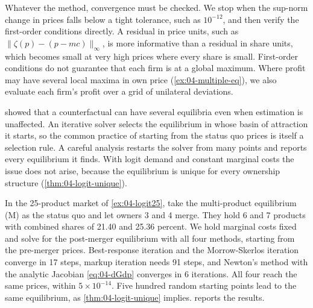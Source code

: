 Whatever the method, convergence must be checked. We stop when the sup-norm change in prices falls below a tight
tolerance, such as $10^{-12}$, and then verify the first-order conditions directly. A residual in price units,
such as $\|\zeta(p) - (p - mc)\|_\infty$, is more informative than a residual in share units, which becomes small
at very high prices where every share is small. First-order conditions do not guarantee that each firm is at a
global maximum. Where profit may have several local maxima in own price (\cref{ex:04-multiple-eq}), we also
evaluate each firm's profit over a grid of unilateral deviations.

 showed that a counterfactual can have several equilibria even when estimation is
unaffected. An iterative solver selects the equilibrium in whose basin of attraction it starts, so the common
practice of starting from the status quo prices is itself a selection rule. A careful analysis restarts the solver
from many points and reports every equilibrium it finds. With logit demand and constant marginal costs the issue
does not arise, because the equilibrium is unique for every ownership structure (\cref{thm:04-logit-unique}).

\begin{example}\label{ex:04-merger-sim}
In the 25-product market of \cref{ex:04-logit25}, take the multi-product equilibrium (M) as the status quo and let
owners 3 and 4 merge. They hold 6 and 7 products with combined shares of 21.40 and 25.36 percent. We hold
marginal costs fixed and solve for the post-merger equilibrium with all four methods, starting from the
pre-merger prices. Best-response iteration and the Morrow-Skerlos iteration converge in 17 steps, markup iteration
needs 91 steps, and Newton's method with the analytic Jacobian \eqref{eq:04-dGdp} converges in 6 iterations. All
four reach the same prices, within
$5 \times 10^{-14}$. Five hundred random starting points lead to the same equilibrium, as
\cref{thm:04-logit-unique} implies.  reports the results.
\end{example}


